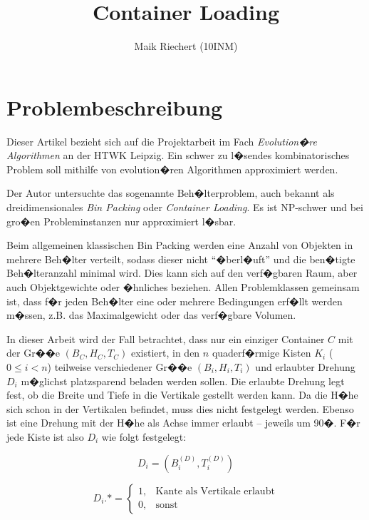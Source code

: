 \documentclass[a4paper,abstracton,12pt]{scrartcl}
\title{Container Loading}
\author{Maik Riechert (10INM)}
\begin{document}
\maketitle

\section{Problembeschreibung}

Dieser Artikel bezieht sich auf die Projektarbeit im Fach \emph{Evolution�re Algorithmen} an der HTWK Leipzig. Ein schwer zu l�sendes kombinatorisches Problem soll mithilfe von evolution�ren Algorithmen approximiert werden.

Der Autor untersuchte das sogenannte Beh�lterproblem, auch bekannt als dreidimensionales \emph{Bin Packing} oder \emph{Container Loading}. Es ist NP-schwer und bei gro�en Probleminstanzen nur approximiert l�sbar.

Beim allgemeinen klassischen Bin Packing werden eine Anzahl von Objekten in mehrere Beh�lter verteilt, sodass dieser nicht "`�berl�uft"' und die ben�tigte Beh�lteranzahl minimal wird. Dies kann sich auf den verf�gbaren Raum, aber auch Objektgewichte oder �hnliches beziehen. Allen Problemklassen gemeinsam ist, dass f�r jeden Beh�lter eine oder mehrere Bedingungen erf�llt werden m�ssen, z.B. das Maximalgewicht oder das verf�gbare Volumen.

In dieser Arbeit wird der Fall betrachtet, dass nur ein einziger Container $C$ mit der Gr��e $(B_C,H_C,T_C)$ existiert, in den $n$ quaderf�rmige Kisten $K_i$ ($0 \le i < n$) teilweise verschiedener Gr��e $(B_i,H_i,T_i)$ und erlaubter Drehung $D_i$ m�glichst platzsparend beladen werden sollen. Die erlaubte Drehung legt fest, ob die Breite und Tiefe in die Vertikale gestellt werden kann. Da die H�he sich schon in der Vertikalen befindet, muss dies nicht festgelegt werden. Ebenso ist eine Drehung mit der H�he als Achse immer erlaubt -- jeweils um 90�. F�r jede Kiste ist also $D_i$ wie folgt festgelegt:

\begin{equation}
	D_i = (B_i^{(D)},  T_i^{(D)})
\end{equation}

\begin{equation}
	D_i.* = \begin{cases} 
	1, & \text{Kante als Vertikale erlaubt}\\
	0, & \text{sonst}
	\end{cases}
\end{equation}
\end{document}
